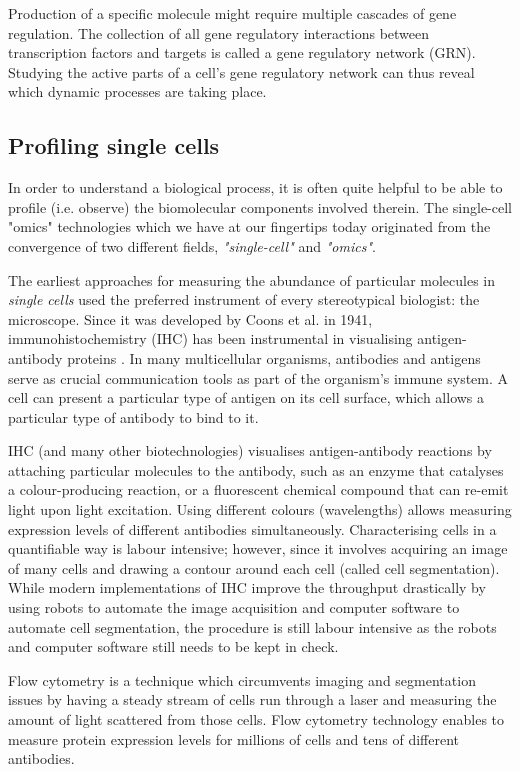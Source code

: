 Production of a specific molecule might require multiple cascades of gene regulation. The collection of all gene regulatory interactions between transcription factors and targets is called a gene regulatory network (GRN). Studying the active parts of a cell's gene regulatory network can thus reveal which dynamic processes are taking place. 

\subsection{Profiling single cells}
In order to understand a biological process, it is often quite helpful to be able to profile (i.e. observe) the biomolecular components involved therein. The single-cell "omics" technologies which we have at our fingertips today originated from the convergence of two different fields, \emph{"single-cell"} and \emph{"omics"}.

The earliest approaches for measuring the abundance of particular molecules in \emph{single cells} used the preferred instrument of every stereotypical biologist: the microscope. Since it was developed by Coons et al. in 1941, immunohistochemistry (IHC) has been instrumental in visualising antigen-antibody proteins \cite{coons_immunologicalpropertiesantibody_1941}. In many multicellular organisms, antibodies and antigens serve as crucial communication tools as part of the organism's immune system. A cell can present a particular type of antigen on its cell surface, which allows a particular type of antibody to bind to it.

IHC (and many other biotechnologies) visualises antigen-antibody reactions by attaching particular molecules to the antibody, such as an enzyme that catalyses a colour-producing reaction, or a fluorescent chemical compound that can re-emit light upon light excitation. Using different colours (wavelengths) allows measuring expression levels of different antibodies simultaneously. Characterising cells in a quantifiable way is labour intensive; however, since it involves acquiring an image of many cells and drawing a contour around each cell (called cell segmentation). While modern implementations of IHC improve the throughput drastically by using robots to automate the image acquisition and computer software to automate cell segmentation, the procedure is still labour intensive as the robots and computer software still needs to be kept in check.

Flow cytometry \cite{fulwyler_electronicseparationbiological_1965} is a technique which circumvents imaging and segmentation issues by having a steady stream of cells run through a laser and measuring the amount of light scattered from those cells. Flow cytometry technology enables to measure protein expression levels for millions of cells and tens of different antibodies. 

